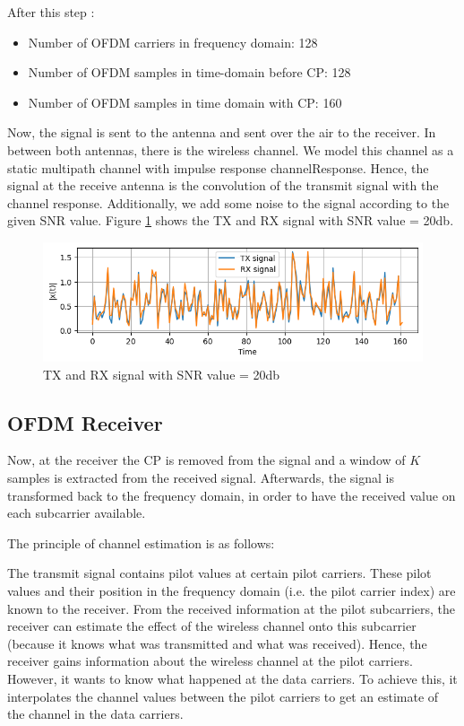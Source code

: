 After this step :
\begin{itemize}
    \item Number of OFDM carriers in frequency domain: 128
    \item Number of OFDM samples in time-domain before CP: 128
    \item Number of OFDM samples in time domain with CP: 160
\end{itemize}

Now, the signal is sent to the antenna and sent over the air to the receiver. In between both antennas, there is the wireless channel. We model this channel as a static multipath channel with impulse response channelResponse. Hence, the signal at the receive antenna is the convolution of the transmit signal with the channel response. Additionally, we add some noise to the signal according to the given SNR value. Figure \ref{tx_rx} shows the TX and RX signal with SNR value = 20db.

\begin{figure}[htbp]
    \centering
    \includegraphics[width=\textwidth]{../Source/results/tx_rx}
    \caption{TX and RX signal with SNR value = 20db}
    \label{tx_rx}
\end{figure}

\subsection{OFDM Receiver}

Now, at the receiver the CP is removed from the signal and a window of $K$ samples is extracted from the received signal. Afterwards, the signal is transformed back to the frequency domain, in order to have the received value on each subcarrier available.

The principle of channel estimation is as follows:

The transmit signal contains pilot values at certain pilot carriers. These pilot values and their position in the frequency domain (i.e. the pilot carrier index) are known to the receiver. From the received information at the pilot subcarriers, the receiver can estimate the effect of the wireless channel onto this subcarrier (because it knows what was transmitted and what was received). Hence, the receiver gains information about the wireless channel at the pilot carriers. However, it wants to know what happened at the data carriers. To achieve this, it interpolates the channel values between the pilot carriers to get an estimate of the channel in the data carriers.

